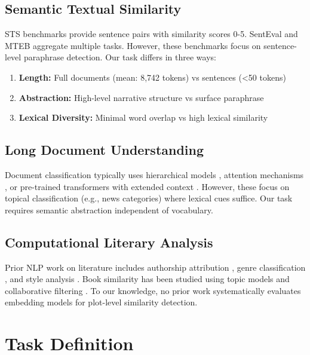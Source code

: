 \documentclass[11pt,a4paper]{article}
\begin{document}
\subsection{Semantic Textual Similarity}

STS benchmarks \cite{Cer2017SemEval,Agirre2016SemEval} provide sentence pairs with similarity scores 0-5. SentEval \cite{Conneau2018SentEval} and MTEB \cite{Muennighoff2023MTEB} aggregate multiple tasks. However, these benchmarks focus on sentence-level paraphrase detection. Our task differs in three ways:

\begin{enumerate}
    \item \textbf{Length:} Full documents (mean: 8,742 tokens) vs sentences (<50 tokens)
    \item \textbf{Abstraction:} High-level narrative structure vs surface paraphrase
    \item \textbf{Lexical Diversity:} Minimal word overlap vs high lexical similarity
\end{enumerate}

\subsection{Long Document Understanding}

Document classification typically uses hierarchical models \cite{Yang2016HAN}, attention mechanisms \cite{Guo2019StarTransformer}, or pre-trained transformers with extended context \cite{Beltagy2020Longformer,Zaheer2020BigBird}. However, these focus on topical classification (e.g., news categories) where lexical cues suffice. Our task requires semantic abstraction independent of vocabulary.

\subsection{Computational Literary Analysis}

Prior NLP work on literature includes authorship attribution \cite{Stamatatos2009Authorship}, genre classification \cite{Underwood2019DistantHorizons}, and style analysis \cite{Hughes2012Quantitative}. Book similarity has been studied using topic models \cite{Jockers2013Macroanalysis} and collaborative filtering \cite{Wan2018ItemRecommendation}. To our knowledge, no prior work systematically evaluates embedding models for plot-level similarity detection.

\section{Task Definition}
\end{document}
